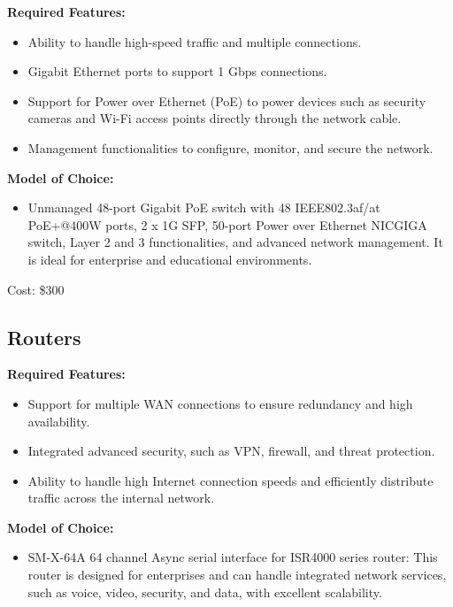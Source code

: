 \documentclass[12pt]{article}
\begin{document}
\textbf{Required Features:}

\begin{itemize}
    \item Ability to handle high-speed traffic and multiple connections.
    \item Gigabit Ethernet ports to support 1 Gbps connections.
    \item Support for Power over Ethernet (PoE) to power devices such as security cameras and Wi-Fi access points directly through the network cable.
    \item Management functionalities to configure, monitor, and secure the network.
\end{itemize}

\textbf{Model of Choice:}

\begin{itemize}
    \item Unmanaged 48-port Gigabit PoE switch with 48 IEEE802.3af/at PoE+@400W ports, 2 x 1G SFP, 50-port Power over Ethernet NICGIGA switch, Layer 2 and 3 functionalities, and advanced network management. It is ideal for enterprise and educational environments.
\end{itemize}

Cost: \$300 \cite{amazon1}

\subsection{Routers}

\textbf{Required Features:}

\begin{itemize}
    \item Support for multiple WAN connections to ensure redundancy and high availability.
    \item Integrated advanced security, such as VPN, firewall, and threat protection.
    \item Ability to handle high Internet connection speeds and efficiently distribute traffic across the internal network.
\end{itemize}

\textbf{Model of Choice:}

\begin{itemize}
    \item SM-X-64A 64 channel Async serial interface for ISR4000 series router: This router is designed for enterprises and can handle integrated network services, such as voice, video, security, and data, with excellent scalability.
\end{itemize}
\end{document}
